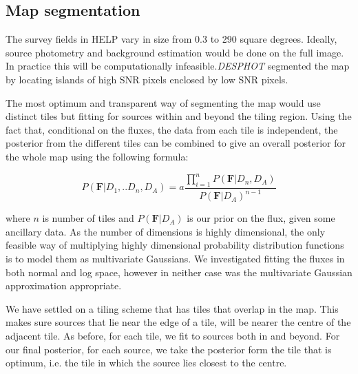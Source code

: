 \documentclass[useAMS,usenatbib]{mnras}
\begin{document}
\subsection{Map segmentation}
The survey fields in HELP vary in size from 0.3 to 290 square degrees. Ideally, source photometry and background estimation would be done on the full image. In practice this will be computationally infeasible.\emph{DESPHOT} segmented the map by locating islands of high SNR pixels enclosed by low SNR pixels.

The most optimum and transparent way of segmenting the map would use distinct tiles but fitting for sources within and beyond the tiling region. Using the fact that, conditional on the fluxes, the data from each tile is independent, the posterior from the different tiles can be combined to give an overall posterior for the whole map using the following formula:

\begin{equation}
P(\mathbf{F}|D_1,..D_n,D_A)=a\frac{\prod_{i=1}^n P(\mathbf{F}|D_n,D_A)}{P(\mathbf{F}|D_A)^{n-1}}
\end{equation}

where $n$ is number of tiles and $P(\mathbf{F}|D_A)$ is our prior on the flux, given some ancillary data. As the number of dimensions is highly dimensional, the only feasible way of multiplying highly dimensional probability distribution functions is to model them as multivariate Gaussians. We investigated fitting the fluxes in both normal and log space, however in neither case was the multivariate Gaussian approximation appropriate.

We have settled on a tiling scheme that has tiles that overlap in the map. This makes sure sources that lie near the edge of a tile, will be nearer the centre of the adjacent tile. As before, for each tile, we fit to sources both in and beyond. For our final posterior, for each source, we take the posterior form the tile that is optimum, i.e. the tile in which the source lies closest to the centre.
\end{document}
